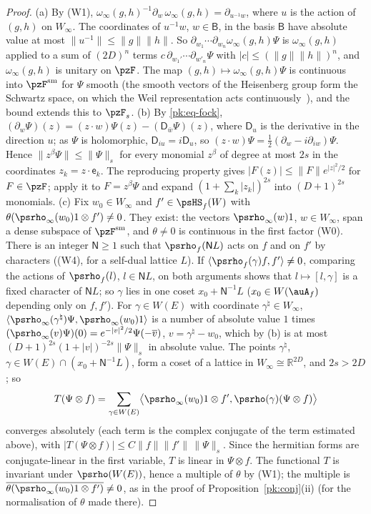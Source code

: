 \documentclass[10pt]{amsart}
\theoremstyle{definition}
\theoremstyle{remark}
\newcommand{\R}{\mathbb R}
\providecommand{\aubar}[1]{\overline{#1}}
\begin{document}
\begin{proof}
(a) By (W1), $\omega_\infty(g,h)^{-1}\partial_w\,\omega_\infty(g,h)=\partial_{u^{-1}w}$, where $u$ is the
action of $(g,h)$ on $W_\infty$. The coordinates of $u^{-1}w$, $w\in\mathsf B$, in the basis
$\mathsf B$ have absolute value at most $\|u^{-1}\|\le\|g\|\|h\|$. So $\partial_{w_1}\cdots\partial_{w_n}
\omega_\infty(g,h)\Psi$ is $\omega_\infty(g,h)$ applied to a sum of $(2D)^n$ terms $c\,\partial_{w_1'}
\cdots\partial_{w'_n}\Psi$ with $|c|\le(\|g\|\|h\|)^n$, and $\omega_\infty(g,h)$ is unitary on $\pzF$.
The map $(g,h)\mapsto\omega_\infty(g,h)\Psi$ is continuous into $\pzF^{\mathrm{sm}}$ for $\Psi$
smooth (the smooth vectors of the Heisenberg group form the Schwartz space, on which the Weil
representation acts continuously~\cite[no.~35]{WeilActa}), and the bound extends this to $\pzF_s$.
(b) By \eqref{pk:eq-fock}, $(\partial_w\Psi)(z)=(z\cdot w)\Psi(z)-(\mathsf D_{\bar w}\Psi)(z)$, where
$\mathsf D_u$ is the derivative in the direction $u$; as $\Psi$ is holomorphic, $\mathsf D_{iu}=
i\mathsf D_u$, so $(z\cdot w)\Psi=\tfrac12(\partial_w-i\partial_{iw})\Psi$. Hence
$\|z^\beta\Psi\|\le\|\Psi\|_s$ for every monomial $z^\beta$ of degree at most $2s$ in the
coordinates $z_k=z\cdot\mathsf e_k$. The reproducing property gives $|F(z)|\le\|F\|e^{|z|^2/2}$ for
$F\in\pzF$; apply it to $F=z^\beta\Psi$ and expand $(1+\sum_k|z_k|)^{2s}$ into $(D+1)^{2s}$ monomials.
(c) Fix $w_0\in W_\infty$ and $f'\in\psHS_f(W)$ with $\theta(\psrho_\infty(w_0)1\otimes f')\ne0$. They
exist: the vectors $\psrho_\infty(w)1$, $w\in W_\infty$, span a dense subspace of $\pzF^{\mathrm{sm}}$,
and $\theta\ne0$ is continuous in the first factor (W0). There is
an integer $\mathsf N\ge1$ such that $\psrho_f(\mathsf NL)$ acts on $f$ and on $f'$ by characters
((W4), for a self-dual lattice $L$). If $\langle\psrho_f(\gamma)f,f'\rangle\ne0$, comparing the
actions of $\psrho_f(l)$, $l\in\mathsf NL$, on both arguments shows that $l\mapsto[l,\gamma]$ is a
fixed character of $\mathsf NL$; so $\gamma$ lies in one coset $x_0+\mathsf N^{-1}L$ ($x_0\in W(\auA_f)$ depending only on $f,f'$). For $\gamma\in
W(E)$ with coordinate $\gamma^\natural\in W_\infty$, $\langle\psrho_\infty(\gamma^\natural)\Psi,\psrho_\infty(w_0)1\rangle$ is a number of absolute value $1$
times $(\psrho_\infty(v)\Psi)(0)=e^{-|v|^2/2}\Psi(-\aubar v)$, $v=\gamma^\natural-w_0$,
which by (b) is at most $(D+1)^{2s}(1+|v|)^{-2s}\|\Psi\|_s$ in absolute value. The points
$\gamma^\natural$, $\gamma\in W(E)\cap(x_0+\mathsf N^{-1}L)$, form a coset of a lattice in
$W_\infty\cong\R^{2D}$, and $2s>2D$; so
\[
T(\Psi\otimes f)=\sum_{\gamma\in W(E)}\bigl\langle\psrho_\infty(w_0)1\otimes f',\psrho(\gamma)(\Psi\otimes f)\bigr\rangle
\]
converges absolutely (each term is the complex conjugate of the term estimated above), with
$|T(\Psi\otimes f)|\le C\|f\|\|f'\|\,\|\Psi\|_s$. Since the hermitian forms are conjugate-linear in
the first variable, $T$ is linear in $\Psi\otimes f$. The functional $T$ is
invariant under $\psrho(W(E))$, hence a multiple of $\theta$ by (W1); the multiple is
$\overline{\theta(\psrho_\infty(w_0)1\otimes f')}\ne0$, as in the proof of Proposition~\ref{pk:conj}(ii)
(for the normalisation of $\theta$ made there).
\end{proof}
\end{document}
